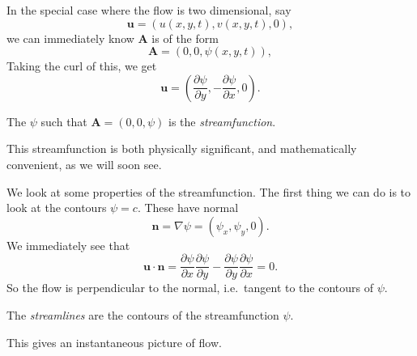 \documentclass[a4paper]{article}
\begin{document}
In the special case where the flow is two dimensional, say
\[
  \mathbf{u} = (u(x, y, t), v(x, y, t), 0),
\]
we can immediately know $\mathbf{A}$ is of the form
\[
  \mathbf{A} = (0, 0, \psi(x, y, t)),
\]
Taking the curl of this, we get
\[
  \mathbf{u} = \left(\frac{\partial \psi}{\partial y}, -\frac{\partial \psi}{\partial x}, 0\right).
\]
\begin{defi}[Streamfunction]
  The $\psi$ such that $\mathbf{A} = (0, 0, \psi)$ is the \emph{streamfunction}.
\end{defi}
This streamfunction is both physically significant, and mathematically convenient, as we will soon see.

We look at some properties of the streamfunction. The first thing we can do is to look at the contours $\psi = c$. These have normal
\[
  \mathbf{n} = \nabla \psi = \left(\psi_x, \psi_y, 0\right).
\]
We immediately see that
\[
  \mathbf{u}\cdot \mathbf{n} = \frac{\partial \psi}{\partial x} \frac{\partial \psi}{\partial y} - \frac{\partial \psi}{\partial y}\frac{\partial \psi}{\partial x} = 0.
\]
So the flow is perpendicular to the normal, i.e.\ tangent to the contours of $\psi$.
\begin{defi}[Streamlines]
  The \emph{streamlines} are the contours of the streamfunction $\psi$.
\end{defi}
This gives an instantaneous picture of flow.
\end{document}
